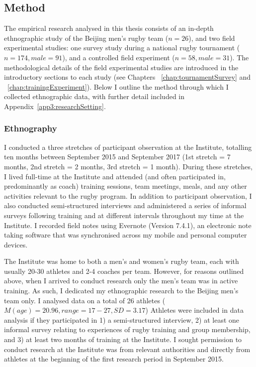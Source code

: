 \begin{CJK}{UTF8}{gbsn}





 \subsection{Method}
 The empirical research analysed in this thesis consists of an  in-depth ethnographic study of the Beijing men's rugby team ($n = 26$), and two field experimental studies: one survey study during a national rugby tournament ($n = 174, male = 91$), and a controlled field experiment ($n = 58, male = 31$).  The methodological details of the field experimental studies are introduced in the introductory sections to each study (see Chapters ~\ref{chap:tournamentSurvey} and ~\ref{chap:trainingExperiment}).  Below I outline the method through which I collected ethnographic data, with further detail included in Appendix~\ref{app3:researchSetting}.

 \subsubsection{Ethnography}
 I conducted a three stretches of participant observation at the Institute, totalling ten months between September 2015 and September 2017 (1st stretch = 7 months, 2nd stretch = 2 months, 3rd stretch = 1 month).  During these stretches, I lived full-time at the Institute and attended (and often participated in, predominantly as coach) training sessions, team meetings, meals, and any other activities relevant to the rugby program.  In addition to participant observation, I also conducted semi-structured interviews and administered a series of informal surveys following training and at different intervals throughout my time at the Institute.  I recorded field notes using Evernote (Version 7.4.1), an electronic note taking software that was synchronised across my mobile and personal computer devices.

 The Institute was home to both a men's and women's rugby team, each with usually 20-30 athletes and 2-4 coaches per team.  However, for reasons outlined above, when I arrived to conduct research only the men's team was in active training.  As such, I dedicated my ethnographic research to the Beijing men's team only.  I analysed data on a total of 26 athletes ($M(age) = 20.96, range = 17-27, SD = 3.17$)  Athletes were included in data analysis if they participated in 1) a semi-structured interview, 2) at least one informal survey relating to experiences of rugby training and group membership, and 3) at least two months of training at the Institute.  I sought permission to conduct research at the Institute was from relevant authorities and directly from athletes at the beginning of the first research period in September 2015.


\end{CJK}
